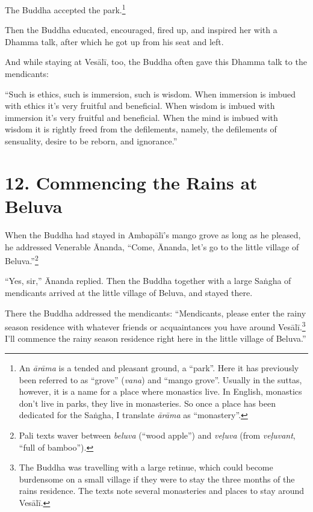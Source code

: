 \documentclass[12pt,openany]{book}%
\begin{document}
The Buddha accepted the park.\footnote{An \textit{\textsanskrit{ārāma}} is a tended and pleasant ground, a “park”. Here it has previously been referred to as “grove” (\textit{vana}) and “mango grove”. Usually in the suttas, however, it is a name for a place where monastics live. In English, monastics don’t live in parks, they live in monasteries. So once a place has been dedicated for the \textsanskrit{Saṅgha}, I translate \textit{\textsanskrit{ārāma}} as “monastery”. } 

Then the Buddha educated, encouraged, fired up, and inspired her with a Dhamma talk, after which he got up from his seat and left. 

And while staying at \textsanskrit{Vesālī}, too, the Buddha often gave this Dhamma talk to the mendicants: 

“Such is ethics, such is immersion, such is wisdom. When immersion is imbued with ethics it’s very fruitful and beneficial. When wisdom is imbued with immersion it’s very fruitful and beneficial. When the mind is imbued with wisdom it is rightly freed from the defilements, namely, the defilements of sensuality, desire to be reborn, and ignorance.” 

\section*{12. Commencing the Rains at Beluva }

When the Buddha had stayed in \textsanskrit{Ambapālī}’s mango grove as long as he pleased, he addressed Venerable Ānanda, “Come, Ānanda, let’s go to the little village of Beluva.”\footnote{Pali texts waver between \textit{beluva} (“wood apple”) and \textit{\textsanskrit{veḷuva}} (from \textit{\textsanskrit{veḷuvant}}, “full of bamboo”). } 

“Yes, sir,” Ānanda replied. Then the Buddha together with a large \textsanskrit{Saṅgha} of mendicants arrived at the little village of Beluva, and stayed there. 

There the Buddha addressed the mendicants: “Mendicants, please enter the rainy season residence with whatever friends or acquaintances you have around \textsanskrit{Vesālī}.\footnote{The Buddha was travelling with a large retinue, which could become burdensome on a small village if they were to stay the three months of the rains residence. The texts note several monasteries and places to stay around \textsanskrit{Vesālī}. } I’ll commence the rainy season residence right here in the little village of Beluva.” 
\end{document}
